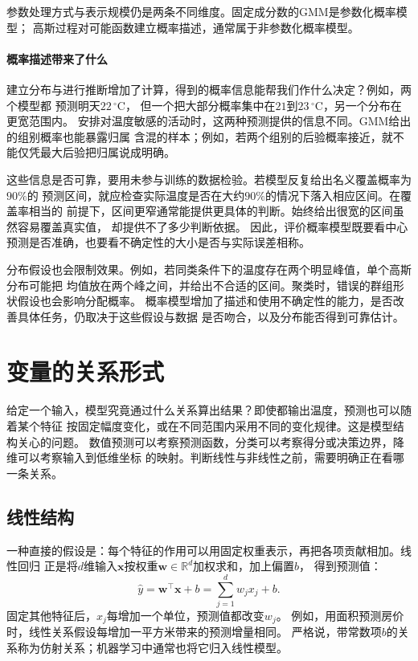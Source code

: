 参数处理方式与表示规模仍是两条不同维度。固定成分数的GMM是参数化概率模型；
高斯过程对可能函数建立概率描述，通常属于非参数化概率模型。

\paragraph{概率描述带来了什么}

建立分布与进行推断增加了计算，得到的概率信息能帮我们作什么决定？例如，两个模型都
预测明天$22\,^{\circ}\mathrm{C}$，
但一个把大部分概率集中在$21$到$23\,^{\circ}\mathrm{C}$，另一个分布在更宽范围内。
安排对温度敏感的活动时，这两种预测提供的信息不同。GMM给出的组别概率也能暴露归属
含混的样本；例如，若两个组别的后验概率接近，就不能仅凭最大后验把归属说成明确。

这些信息是否可靠，要用未参与训练的数据检验。若模型反复给出名义覆盖概率为$90\%$的
预测区间，就应检查实际温度是否在大约$90\%$的情况下落入相应区间。在覆盖率相当的
前提下，区间更窄通常能提供更具体的判断。始终给出很宽的区间虽然容易覆盖真实值，
却提供不了多少判断依据。
因此，评价概率模型既要看中心预测是否准确，也要看不确定性的大小是否与实际误差相称。

分布假设也会限制效果。例如，若同类条件下的温度存在两个明显峰值，单个高斯分布可能把
均值放在两个峰之间，并给出不合适的区间。聚类时，错误的群组形状假设也会影响分配概率。
概率模型增加了描述和使用不确定性的能力，是否改善具体任务，仍取决于这些假设与数据
是否吻合，以及分布能否得到可靠估计。

\section{变量的关系形式}
\label{sec:models-structure}

给定一个输入，模型究竟通过什么关系算出结果？即使都输出温度，预测也可以随着某个特征
按固定幅度变化，或在不同范围内采用不同的变化规律。这是模型结构关心的问题。
数值预测可以考察预测函数，分类可以考察得分或决策边界，降维可以考察输入到低维坐标
的映射。判断线性与非线性之前，需要明确正在看哪一条关系。

\subsection{线性结构}
\label{sec:models-linear}

一种直接的假设是：每个特征的作用可以用固定权重表示，再把各项贡献相加。线性回归
正是将$d$维输入$\bm{x}$按权重$\bm{w}\in\mathbb{R}^{d}$加权求和，加上偏置$b$，
得到预测值：
\begin{equation}
  \hat{y}=\bm{w}^{\top}\bm{x}+b
  =\sum_{j=1}^{d}w_jx_j+b.
  \label{eq:models-linear-score}
\end{equation}
固定其他特征后，$x_j$每增加一个单位，预测值都改变$w_j$。
例如，用面积预测房价时，线性关系假设每增加一平方米带来的预测增量相同。
严格说，带常数项$b$的关系称为仿射关系；机器学习中通常也将它归入线性模型。

